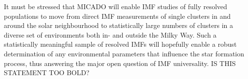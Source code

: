 It must be stressed that MICADO will enable IMF studies of fully resolved populations to move from direct IMF measurements of single clusters in and around the solar neighbourhood to statistically large numbers of clusters in a diverse set of environments both in- and outside the Milky Way. Such a statistically meaningful sample of resolved IMFs will hopefully enable a robust determination of any environmental parameters that influence the star formation process, thus answering the major open question of IMF universality. \rewrite IS THIS STATEMENT TOO BOLD?

% 









    
    




